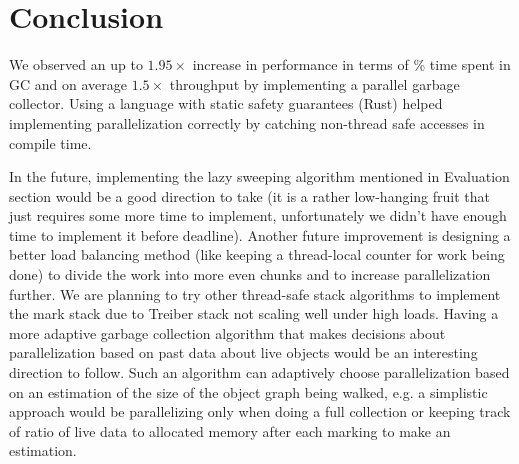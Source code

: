 \section{Conclusion} \label{conclusion}

We observed an up to $1.95\times$ increase in performance in terms of \% time spent in GC and on average $1.5\times$ throughput by implementing a parallel garbage collector.
Using a language with static safety guarantees (Rust) helped implementing parallelization correctly by catching non-thread safe accesses in compile time.

In the future, implementing the lazy sweeping algorithm mentioned in Evaluation section would be a good direction to take (it is a rather low-hanging fruit that just requires some more time to implement, unfortunately we didn't have enough time to implement it before deadline).
Another future improvement is designing a better load balancing method (like keeping a thread-local counter for work being done) to divide the work into more even chunks and to increase parallelization further.
We are planning to try other thread-safe stack algorithms to implement the mark stack due to Treiber stack not scaling well under high loads.
Having a more adaptive garbage collection algorithm that makes decisions about parallelization based on past data about live objects would be an interesting direction to follow.
Such an algorithm can adaptively choose parallelization based on an estimation of the size of the object graph being walked, e.g. a simplistic approach would be parallelizing only when doing a full collection or keeping track of ratio of live data to allocated memory after each marking to make an estimation.

